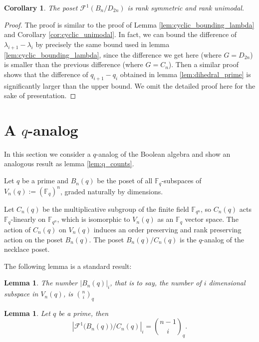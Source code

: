 \documentclass{amsart}
\newtheorem{cor}[thm]{Corollary}
\newtheorem{lem}[thm]{Lemma}
\theoremstyle{remark}
\newcommand\BF{{\mathbb F}}
\begin{document}
\begin{cor}{\label{dihedral003}} 
The poset $\mathcal F^1(B_n/D_{2n})$ is rank symmetric and rank unimodal.
\end{cor}

\begin{proof}
The proof is similar to the proof of Lemma \ref{lem:cyclic_bounding_lambda} and Corollary \ref{cor:cyclic_unimodal}. In fact, we can bound the difference of $\lambda_{i+1} - \lambda_i$ by precisely the same bound used in lemma \ref{lem:cyclic_bounding_lambda}, since the difference we get here (where $G = D_{2n}$) is smaller than the previous difference (where $G= C_n$). Then a similar proof shows that the difference of $q_{i+1} - q_i$ obtained  in lemma \ref{lem:dihedral_prime} is significantly larger than the upper bound. We omit the detailed proof here for the sake of presentation.
\end{proof}


\section{A $q$-analog}
\label{sec:q_analog}

In this section we consider a $q$-analog of the Boolean algebra and show an analogous result as lemma \ref{lem:q_counts}. 

Let $q$ be a prime and $B_n(q)$ be the poset of all $\BF_q$-subspaces of $V_n(q) := (\BF_q)^n$, graded naturally by dimensions. 

Let $C_n(q)$ be the multiplicative subgroup of the finite field $\BF_{q^n}$, so $C_n(q)$ acts $\BF_q$-linearly on $\BF_{q^n}$, which is isomorphic to $V_n(q)$ as an $\BF_q$ vector space. The action of $C_n(q)$ on $V_n(q)$ induces an order preserving and rank preserving action on the poset $B_n(q)$. The poset $B_n(q)/C_n(q)$ is the $q$-analog of the necklace poset.  

The following lemma is a standard result:

\begin{lem}
\label{q:number_subspaces}
The number $|B_n(q)|_i$, that is to say, the number of $i$ dimensional subspace in $V_n(q)$, is ${n \choose i}_q$
\end{lem}


\begin{lem} 

Let $q$ be a prime,  then $$ |\mathcal F^1 \big(B_n(q)\big)/C_n(q)|_{i} = {n-1 \choose i}_q.$$
\end{lem}
\end{document}

